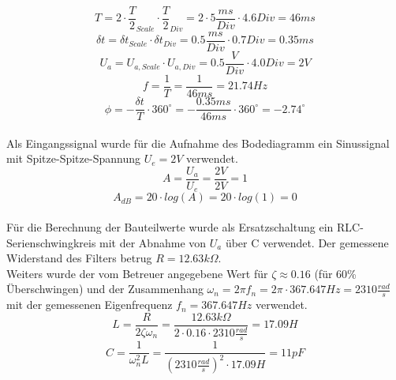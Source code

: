 \documentclass[12pt,a4paper,ngerman]{article}
\begin{document}
\begin{equation}
T = 2 \cdot \frac{T}{2}_{Scale} \cdot \frac{T}{2}_{Div} = 2 \cdot 5\frac{ms}{Div} \cdot 4.6 Div = 46ms
\end{equation}
\begin{equation}
\delta t = \delta t_{Scale} \cdot \delta t_{Div} = 0.5\frac{ms}{Div} \cdot 0.7Div = 0.35ms
\end{equation}
\begin{equation}
U_a = U_{a,Scale} \cdot U_{a,Div} = 0.5\frac{V}{Div} \cdot 4.0Div = 2V
\end{equation}
\begin{equation}
f = \frac{1}{T} = \frac{1}{46ms} = 21.74Hz
\end{equation}
\begin{equation}
\phi = - \frac{\delta t}{T} \cdot 360^\circ = -\frac{0.35ms}{46ms	} \cdot 360^\circ = -2.74^\circ
\end{equation}\\
Als Eingangssignal wurde für die Aufnahme des Bodediagramm ein Sinussignal mit Spitze-Spitze-Spannung $U_e = 2V$ verwendet.
\begin{equation}
A = \frac{U_a}{U_e} = \frac{2V}{2V} = 1
\end{equation}
\begin{equation}
A_{dB} = 20 \cdot log(A) = 20 \cdot log(1) = 0
\end{equation}
\\
Für die Berechnung der Bauteilwerte wurde als Ersatzschaltung ein RLC-Serienschwingkreis mit der Abnahme von $U_a$ über C verwendet. Der gemessene Widerstand des Filters betrug $R = 12.63k\Omega$. \\
Weiters wurde der vom Betreuer angegebene Wert für $\zeta \approx 0.16$ (für 60\% Überschwingen) und der Zusammenhang $\omega_n = 2 \pi f_n = 2 \pi \cdot 367.647Hz = 2310\frac{rad}{s}$ mit der gemessenen Eigenfrequenz $f_n = 367.647Hz$ verwendet.
\begin{equation}
L = \frac{R}{2 \zeta \omega_n} = \frac{12.63k\Omega}{2 \cdot 0.16 \cdot 2310\frac{rad}{s}} = 17.09H
\end{equation}
\begin{equation}
C = \frac{1}{\omega_n^2L} = \frac{1}{(2310\frac{rad}{s})^2 \cdot 17.09H} = 11pF
\end{equation}
\end{document}
